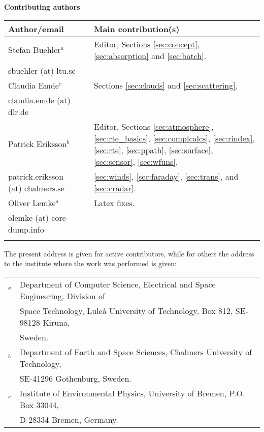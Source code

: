 \documentclass[11pt,twoside,a4paper,fleqn]{book}
\begin{document}
%
\newpage
\thispagestyle{plain}
%
\begin{center}
  {\Large \bf Contributing authors}
\end{center}
\vspace*{5mm}
\begin{tabular}{lp{10mm}l}
  \hline
  {\bf Author/email} & & {\bf Main contribution(s)} \\
  \hline
  Stefan Buehler$^a$ & & Editor, Sections \ref{sec:concept},
  \ref{sec:absorption} and \ref{sec:batch}.\\
  sbuehler (at) ltu.se & &        \\
 \hline
  Claudia Emde$^c$ & & Sections \ref{sec:clouds} and \ref{sec:scattering}.\\
  claudia.emde (at) dlr.de & & \\
  \hline
  Patrick Eriksson$^b$ &  & Editor, 
  Sections \ref{sec:atmosphere}, \ref{sec:rte_basics}, \ref{sec:complcalcs}, 
  \ref{sec:rindex}, \ref{sec:rte}, \ref{sec:ppath}, \ref{sec:surface}, 
  \ref{sec:sensor}, \ref{sec:wfuns}, \\  
  patrick.eriksson (at) chalmers.se & & \ref{sec:winds}, \ref{sec:faraday}, 
  \ref{sec:trans}, 
  and \ref{sec:cradar}. \\
  \hline
  Oliver Lemke$^a$ & & Latex fixes.\\
  olemke (at) core-dump.info & & \\
  \hline
 &&\\
\end{tabular}


\vspace{1ex}\noindent
The present address is given for active contributors, while for others
the address to the institute where the work was performed is given:\\

\begin{tabular}[c]{ll}
$^a$&Department of Computer Science, Electrical and Space Engineering,
Division of\\&Space Technology, Lule{\aa} University of Technology, Box
812, SE-98128 Kiruna,\\&Sweden. \\
$^b$&Department of Earth and Space Sciences, Chalmers University of Technology,
\\&SE-41296 Gothenburg, Sweden. \\
$^c$&Institute of Environmental Physics, University of Bremen, P.O. Box 33044, 
\\&D-28334 Bremen, Germany. 
\end{tabular}
\end{document}
